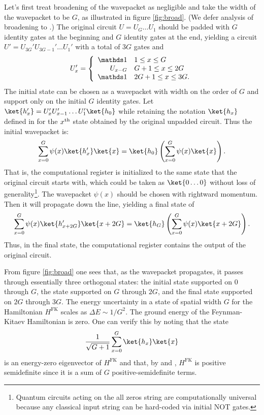 \documentclass[11pt]{article}
\begin{document}
Let's first treat broadening of the wavepacket as negligible and take the width of the wavepacket to be $G$, as illustrated in figure \ref{fig:broad}. (We defer analysis of broadening to .) The original circuit $U=U_G \ldots U_1$ should be padded with $G$ identity gates at the beginning and $G$ identity gates at the end, yielding a circuit $U' = U_{3G}' U_{3G-1}' \ldots U_1'$ with a total of $3G$ gates and
\begin{equation}
U_x' = \left\{ \begin{array}{rl}
\id & 1 \leq x \leq G \\
U_{x-G} & G+1 \leq x \leq 2G \\
\id & 2G+1 \leq x \leq 3G.
\end{array} \right.
\end{equation}
The initial state can be chosen as a wavepacket with width on the order of $G$ and support only on the initial $G$ identity gates. Let $\ket{h_x'} = U_x' U_{x-1}' \ldots U_1' \ket{h_0}$ while retaining the notation $\ket{h_x}$ defined in  for the $x^\mathrm{th}$ state obtained by the original unpadded circuit. Thus the initial wavepacket is:
\begin{equation}
\sum_{x=0}^G \psi(x) \ket{h_x'} \ket{x} = \ket{h_0} \left( \sum_{x=0}^G \psi(x) \ket{x} \right).
\end{equation}
That is, the computational register is initialized to the same state that the original circuit starts with, which could be taken as $\ket{0\ldots0}$ without loss of generality\footnote{Quantum circuits acting on the all zeros string are computationally universal because any classical input string can be hard-coded via initial NOT gates.}. The wavepacket $\psi(x)$ should be chosen with rightward momentum. Then it will propagate down the line, yielding a final state of
\begin{equation}
\sum_{x=0}^G \psi(x) \ket{h_{x+2G}'} \ket{x+2G} = \ket{h_G} \left( \sum_{x=0}^G \psi(x) \ket{x+2G} \right).
\end{equation}
Thus, in the final state, the computational register contains the output of the original circuit. 

From figure \ref{fig:broad} one sees that, as the wavepacket propagates, it passes through essentially three orthogonal states: the initial state supported on $0$ through $G$, the state supported on $G$ through $2G$, and the final state supported on $2G$ through $3G$. The energy uncertainty in a state of spatial width $G$ for the Hamiltonian $H^{\mathrm{FK}}$ scales as $\Delta E \sim 1/G^2$. The ground energy of the Feynman-Kitaev Hamiltonian is zero. One can verify this by noting that the state 
\begin{equation}
\frac{1}{\sqrt{G+1}} \sum_{x=0}^G \ket{h_x} \ket{x}
\end{equation}
is an energy-zero eigenvector of $H^{\mathrm{FK}}$ and that, by  and , $H^{\mathrm{FK}}$ is positive semidefinite since it is a sum of $G$ positive-semidefinite terms. 
\end{document}
